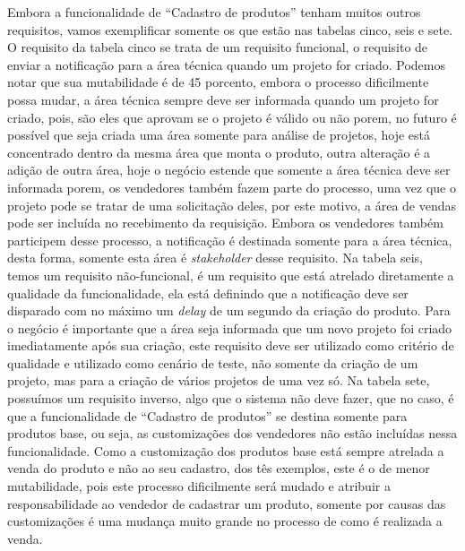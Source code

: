       Embora a funcionalidade de “Cadastro de produtos” tenham muitos outros requisitos,
      vamos exemplificar somente os que estão nas tabelas cinco, seis e sete.
      O requisito da tabela cinco se trata de um requisito funcional, o requisito de
      enviar a notificação para a área técnica quando um projeto for criado. Podemos
      notar que sua mutabilidade é de 45 porcento, embora o processo dificilmente possa mudar,
      a área técnica sempre deve ser informada quando um projeto for criado, pois,
      são eles que aprovam se o projeto é válido ou não porem, no futuro é possível
      que seja criada uma área somente para análise de projetos, hoje está
      concentrado dentro da mesma área que monta o produto, outra alteração é a
      adição de outra área, hoje o negócio estende que somente a área técnica deve
      ser informada porem, os vendedores também fazem parte do processo, uma vez que
      o projeto pode se tratar de uma solicitação deles, por este motivo, a área de
      vendas pode ser incluída no recebimento da requisição. Embora os vendedores
      também participem desse processo, a notificação é destinada somente para a área
      técnica, desta forma, somente esta área é \textit{stakeholder} desse
      requisito. Na tabela seis, temos um requisito não-funcional, é um requisito
      que está atrelado diretamente a qualidade da funcionalidade, ela está definindo
      que a notificação deve ser disparado com no máximo um \textit{delay} de um
      segundo da criação do produto. Para o negócio é importante que a área seja
      informada que um novo projeto foi criado imediatamente após sua criação, este
      requisito deve ser utilizado como critério de qualidade e utilizado como cenário
      de teste, não somente da criação de um projeto, mas para a criação de vários
      projetos de uma vez só. Na tabela sete, possuímos um requisito inverso, algo
      que o sistema não deve fazer, que no caso, é que a funcionalidade de “Cadastro
      de produtos” se destina somente para produtos base, ou seja, as customizações
      dos vendedores não estão incluídas nessa funcionalidade. Como a customização
      dos produtos base está sempre atrelada a venda do produto e não ao seu cadastro,
      dos tês exemplos, este é o de menor mutabilidade, pois este processo dificilmente
      será mudado e atribuir a responsabilidade ao vendedor de cadastrar um produto,
      somente por causas das customizações é uma mudança muito grande no processo
      de como é realizada a venda.

